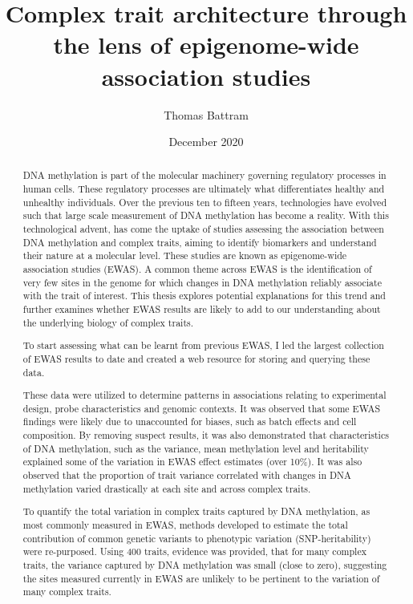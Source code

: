 \documentclass[11pt,oneside]{bristolthesis}
\title{Complex trait architecture through the lens of epigenome-wide association studies}
\author{Thomas Battram}
\date{December 2020}
\begin{document}
  \maketitle

\frontmatter %
\pagestyle{empty} %
  \begin{abstract}
    DNA methylation is part of the molecular machinery governing regulatory processes in human cells. These regulatory processes are ultimately what differentiates healthy and unhealthy individuals. Over the previous ten to fifteen years, technologies have evolved such that large scale measurement of DNA methylation has become a reality. With this technological advent, has come the uptake of studies assessing the association between DNA methylation and complex traits, aiming to identify biomarkers and understand their nature at a molecular level. These studies are known as epigenome-wide association studies (EWAS). A common theme across EWAS is the identification of very few sites in the genome for which changes in DNA methylation reliably associate with the trait of interest. This thesis explores potential explanations for this trend and further examines whether EWAS results are likely to add to our understanding about the underlying biology of complex traits.

    To start assessing what can be learnt from previous EWAS, I led the largest collection of EWAS results to date and created a web resource for storing and querying these data.

    These data were utilized to determine patterns in associations relating to experimental design, probe characteristics and genomic contexts. It was observed that some EWAS findings were likely due to unaccounted for biases, such as batch effects and cell composition. By removing suspect results, it was also demonstrated that characteristics of DNA methylation, such as the variance, mean methylation level and heritability explained some of the variation in EWAS effect estimates (over 10\%). It was also observed that the proportion of trait variance correlated with changes in DNA methylation varied drastically at each site and across complex traits.

    To quantify the total variation in complex traits captured by DNA methylation, as most commonly measured in EWAS, methods developed to estimate the total contribution of common genetic variants to phenotypic variation (SNP-heritability) were re-purposed. Using 400 traits, evidence was provided, that for many complex traits, the variance captured by DNA methylation was small (close to zero), suggesting the sites measured currently in EWAS are unlikely to be pertinent to the variation of many complex traits.


\end{abstract}
\end{document}
